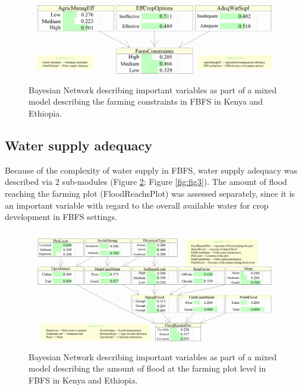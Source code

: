 \documentclass[]{elsarticle} %
\begin{document}
\begin{figure}[!h]

{\centering \includegraphics[width=1\linewidth,]{figures/Modelling_FBFS_Suppl_Farming_Constraints_BNs_plot} 

}

\caption{Bayesian Network describing important variables as part of a mixed model describing the farming constraints in FBFS in Kenya and Ethiopia.}\label{fig:fig1}
\end{figure}

\hypertarget{refs12}{%
\subsection{Water supply adequacy}\label{refs12}}

Because of the complexity of water supply in FBFS, water supply adequacy was described via 2 sub-modules (Figure \ref{fig:fig2}; Figure \ref{fig:fig3}). The amount of flood reaching the farming plot (FloodReachsPlot) was assessed separately, since it is an important variable with regard to the overall available water for crop development in FBFS settings.

\begin{figure}[!h]

{\centering \includegraphics[width=1\linewidth,]{figures/Modelling_FBFS_Suppl_flood_reaching_plot_BNs_plot} 

}

\caption{Bayesian Network describing important variables as part of a mixed model describing the amount of flood at the farming plot level in FBFS in Kenya and Ethiopia.}\label{fig:fig2}
\end{figure}
\end{document}
